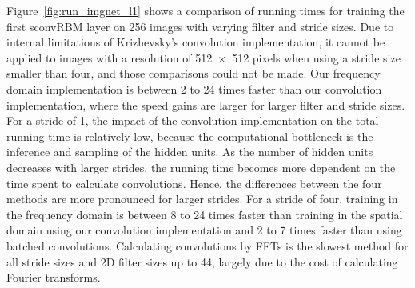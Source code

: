 Figure~\ref{fig:run_imgnet_l1} shows a comparison of running times for training
the first sconvRBM layer on 256 images with varying filter and stride sizes.
Due to internal limitations of Krizhevsky's convolution implementation, it
cannot be applied to images with a resolution of \num{512x512} pixels when using
a stride size smaller than four, and those comparisons could not be made. Our
frequency domain implementation is between 2 to 24 times faster than our
convolution implementation, where the speed gains are larger for larger filter
and stride sizes. For a stride of 1, the impact of the convolution
implementation on the total running time is relatively low, because the
computational bottleneck is the inference and sampling of the hidden
units.
As the number of hidden units decreases with larger strides, the running time
becomes more dependent on the time spent to calculate convolutions.
Hence, the differences between the four methods are more pronounced for larger
strides. For a stride of four, training in the frequency domain is between 8 to
24 times faster than training in the spatial domain using our convolution
implementation and 2 to 7 times faster than using batched convolutions.
Calculating convolutions by FFTs is the slowest method for all stride sizes and
2D filter sizes up to 44, largely due to the cost of calculating Fourier
transforms.


